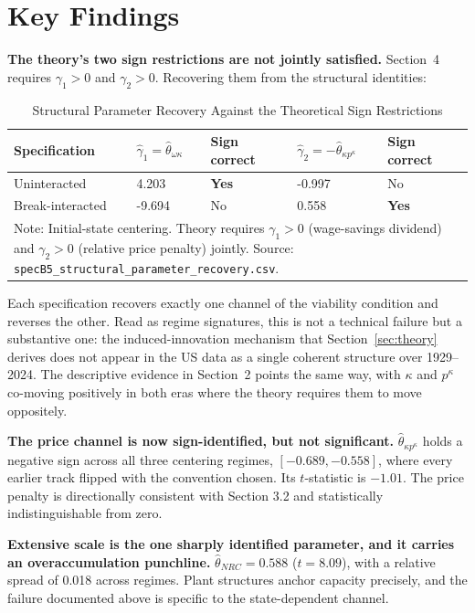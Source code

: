 \documentclass[11pt,a4paper]{article}
\begin{document}
\FloatBarrier
\section{Key Findings}

\textbf{The theory's two sign restrictions are not jointly satisfied.} Section~4 requires $\gamma_1 > 0$ and $\gamma_2 > 0$. Recovering them from the structural identities:

\begin{table}[H]
\centering
\caption{Structural Parameter Recovery Against the Theoretical Sign Restrictions}
\label{tab:signs}
\small
\begin{tabular}{p{3.9cm}p{3.2cm}p{2.2cm}p{3.2cm}p{2.2cm}}
\toprule
Specification & $\hat{\gamma}_1 = \hat{\theta}_{\omega\kappa}$ & Sign correct & $\hat{\gamma}_2 = -\hat{\theta}_{\kappa p^{\kappa}}$ & Sign correct \\
\midrule
Uninteracted & 4.203 & \textbf{Yes} & -0.997 & No \\
Break-interacted & -9.694 & No & 0.558 & \textbf{Yes} \\
\bottomrule
\multicolumn{5}{p{15.5cm}}{\footnotesize Note: Initial-state centering. Theory requires $\gamma_1 > 0$ (wage-savings dividend) and $\gamma_2 > 0$ (relative price penalty) jointly. Source: \texttt{specB5\_structural\_parameter\_recovery.csv}.}
\end{tabular}
\end{table}

Each specification recovers exactly one channel of the viability condition and reverses the other. Read as regime signatures, this is not a technical failure but a substantive one: the induced-innovation mechanism that Section~\ref{sec:theory} derives does not appear in the US data as a single coherent structure over 1929--2024. The descriptive evidence in Section~2 points the same way, with $\kappa$ and $p^{\kappa}$ co-moving positively in both eras where the theory requires them to move oppositely.

\textbf{The price channel is now sign-identified, but not significant.} $\hat{\theta}_{\kappa p^{\kappa}}$ holds a negative sign across all three centering regimes, $[-0.689, -0.558]$, where every earlier track flipped with the convention chosen. Its $t$-statistic is $-1.01$. The price penalty is directionally consistent with Section 3.2 and statistically indistinguishable from zero.

\textbf{Extensive scale is the one sharply identified parameter, and it carries an overaccumulation punchline.} $\hat{\theta}_{NRC} = 0.588$ ($t = 8.09$), with a relative spread of 0.018 across regimes. Plant structures anchor capacity precisely, and the failure documented above is specific to the state-dependent channel.
\end{document}
